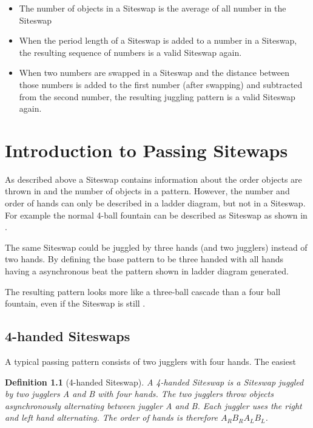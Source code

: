 \documentclass[a4paper,12pt,parskip=full]{scrreprt}
\newtheorem{definition}{Definition}
\begin{document}
	\begin{itemize}
		\item The number of objects in a Siteswap is the average of all number in the Siteswap
		\item When the period length of a Siteswap is added to a number in a Siteswap, the resulting sequence of numbers is a valid Siteswap again.
		\item When two numbers are swapped in a Siteswap and the distance between those numbers is added to the first number (after swapping) and subtracted from the second number, the resulting juggling pattern is a valid Siteswap again.
	\end{itemize}

	
	
	
	
	\chapter{Introduction to Passing Sitewaps}
	
	As described above a Siteswap contains information about the order objects are thrown in and the number of objects in a pattern. However, the number and order of hands can only be described in a ladder diagram, but not in a Siteswap. For example the normal 4-ball fountain can be described as Siteswap  as shown in .
	
	
	The same Siteswap could be juggled by three hands (and two jugglers) instead of two hands. By defining the base pattern to be three handed with all hands having a asynchronous beat the pattern shown in ladder diagram  generated.
	
	
	The resulting pattern looks more like a three-ball cascade than a four ball fountain, even if the Siteswap is still .
	
	\section{4-handed Siteswaps}
	
	A typical passing pattern consists of two jugglers with four hands. The easiest
	
	\begin{definition}[4-handed Siteswap]
		A 4-handed Siteswap is a Siteswap juggled by two jugglers A and B with four hands. The two jugglers throw objects asynchronously alternating between juggler A and B. Each juggler uses the right and left hand alternating. The order of hands is therefore $A_R B_R A_L B_L$.
	\end{definition}
	
\end{document}
